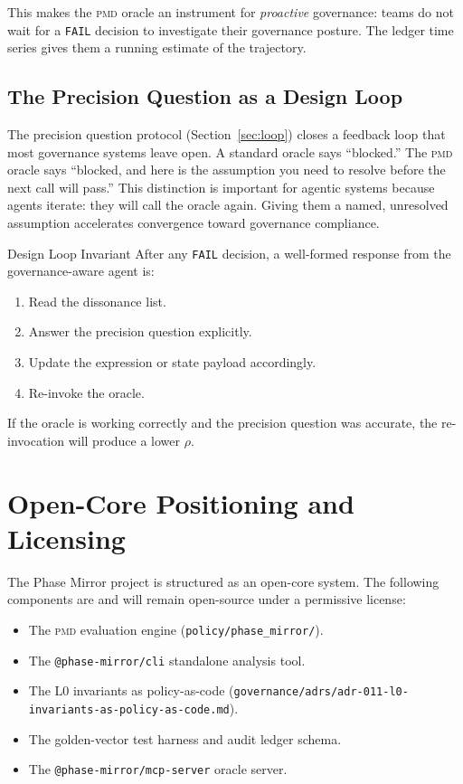 \documentclass[11pt,letterpaper]{article}
\theoremstyle{remark}
\newcommand{\pmd}{\textsc{pmd}}
\newcommand{\rhosys}{\rho}
\begin{document}
This makes the \pmd{} oracle an instrument for \emph{proactive} governance:
teams do not wait for a \texttt{FAIL} decision to investigate their
governance posture.  The ledger time series gives them a running estimate
of the trajectory.

\subsection{The Precision Question as a Design Loop}

The precision question protocol (Section~\ref{sec:loop}) closes a feedback
loop that most governance systems leave open.  A standard oracle says
``blocked.''  The \pmd{} oracle says ``blocked, and here is the assumption
you need to resolve before the next call will pass.''  This distinction
is important for agentic systems because agents iterate: they will call
the oracle again.  Giving them a named, unresolved assumption accelerates
convergence toward governance compliance.

\begin{oraclebox}{Design Loop Invariant}
After any \texttt{FAIL} decision, a well-formed response from the
governance-aware agent is:
\begin{enumerate}[leftmargin=1em]
  \item Read the dissonance list.
  \item Answer the precision question explicitly.
  \item Update the expression or state payload accordingly.
  \item Re-invoke the oracle.
\end{enumerate}
If the oracle is working correctly and the precision question was
accurate, the re-invocation will produce a lower $\rhosys$.
\end{oraclebox}

\section{Open-Core Positioning and Licensing}
\label{sec:business}

The Phase Mirror project is structured as an open-core system.  The
following components are and will remain open-source under a permissive
license:

\begin{itemize}[leftmargin=1.5em]
  \item The \pmd{} evaluation engine
        (\texttt{policy/phase\_mirror/}).
  \item The \texttt{@phase-mirror/cli} standalone analysis tool.
  \item The L0 invariants as policy-as-code
        (\texttt{governance/adrs/adr-011-l0-invariants-as-policy-as-code.md}).
  \item The golden-vector test harness and audit ledger schema.
  \item The \texttt{@phase-mirror/mcp-server} oracle server.
\end{itemize}
\end{document}
